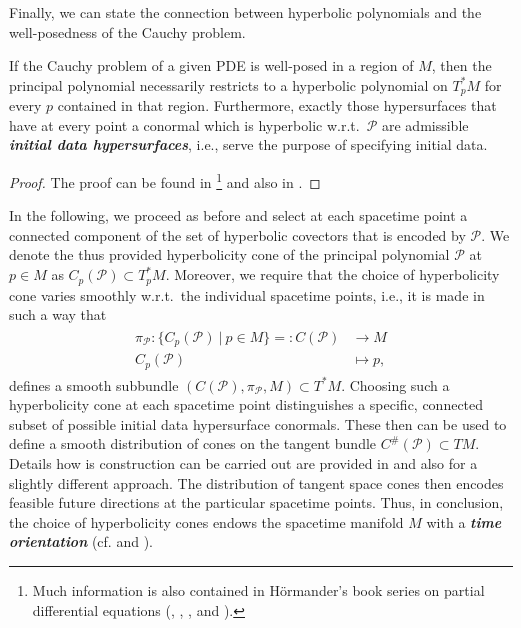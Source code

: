 Finally, we can state the connection between hyperbolic polynomials and the well-posedness of the Cauchy problem.
\begin{theorem}
If the Cauchy problem of a given PDE is well-posed in a region of $M$, then the principal polynomial necessarily restricts to a hyperbolic polynomial on $T_p^{\ast}M$ for every $p$ contained in that region. Furthermore, exactly those hypersurfaces that have at every point a conormal which is hyperbolic w.r.t.\ $\mathcal{P}$ are admissible \textit{\textbf{initial data hypersurfaces}}, i.e., serve the purpose of specifying initial data.
\end{theorem}
\begin{proof}
The proof can be found in \cite{Hormander1977}\footnote{Much information is also contained in Hörmander's book series on partial differential equations (\cite{hormander1994analysis}, \cite{hormander2004analysis}, \cite{hormander2009analysis}, and \cite{hormander2015analysis}).} and also in \cite{Ivrii_1974}. 
\end{proof}
In the following, we proceed as before and select at each spacetime point a connected component of the set of hyperbolic covectors that is encoded by $\mathcal{P}$. We denote the thus provided hyperbolicity cone of the principal polynomial $\mathcal{P}$ at $p \in M$ as $C_p(\mathcal{P}) \subset T_p^{\ast}M$.
Moreover, we require that the choice of hyperbolicity cone varies smoothly w.r.t.\ the individual spacetime points, i.e., it is made in such a way that
\begin{align}
\begin{aligned}
\pi_{\mathcal{P}}: \{ C_p(\mathcal{P}) \ \vert \ p \in M\}=: C(\mathcal{P}) &\longrightarrow M\\
C_p(\mathcal{P}) &\longmapsto p,
\end{aligned}
\end{align}
defines a smooth subbundle $(C(\mathcal{P}), \pi_{\mathcal{P}}, M) \subset T^{\ast}M$.
Choosing such a hyperbolicity cone at each spacetime point distinguishes a specific, connected subset of possible initial data hypersurface conormals. These then can be used to define a smooth distribution of cones on the tangent bundle $C^{\#}(\mathcal{P}) \subset TM$. Details how is construction can be carried out are provided in \cite{Rivera} and also \cite{2012arXiv1211.1914K} for a slightly different approach.
The distribution of tangent space cones then encodes feasible future directions at the particular spacetime points.
Thus, in conclusion,  the choice of hyperbolicity cones endows the spacetime manifold $M$ with a \textit{\textbf{time orientation}} (cf. \cite{2012arXiv1211.1914K} and \cite{Rivera}).

